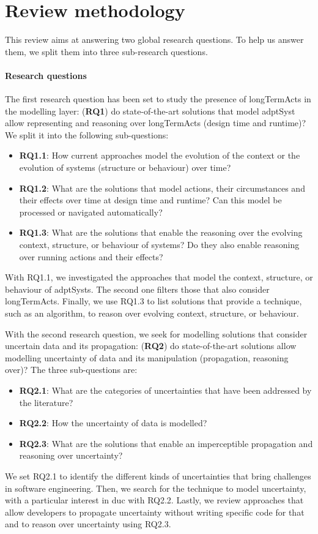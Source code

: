 \section{Review methodology}
\label{sec:sota:methodo}

This review aims at answering two global research questions.
To help us answer them, we split them into three sub-research questions.

\paragraph{Research questions}
The first research question has been set to study the presence of \glspl{longTermAct} in the modelling layer: (\textbf{RQ1}) do state-of-the-art solutions that model \gls{adptSyst} allow representing and reasoning over \glspl{longTermAct} (design time and runtime)? 
We split it into the following sub-questions:
\begin{itemize}
	\item \textbf{RQ1.1}: How current approaches model the evolution of the \gls{context} or the evolution of systems (\gls{structure} or \gls{behaviour}) over time?
	\item \textbf{RQ1.2}: What are the solutions that model \glspl{action}, their \glspl{circumstance} and their effects over time at design time and runtime? Can this model be processed or navigated automatically?
	\item \textbf{RQ1.3}: What are the solutions that enable the reasoning over the evolving \gls{context}, \gls{structure}, or \gls{behaviour} of systems? Do they also enable reasoning over running \glspl{action} and their effects?
\end{itemize}
With RQ1.1, we investigated the approaches that model the \gls{context}, \gls{structure}, or \gls{behaviour} of \glspl{adptSyst}.
The second one filters those that also consider \glspl{longTermAct}.
Finally, we use RQ1.3 to list solutions that provide a technique, such as an algorithm, to reason over evolving \gls{context}, \gls{structure}, or \gls{behaviour}.

With the second research question, we seek for modelling solutions that consider uncertain data and its propagation: (\textbf{RQ2}) do state-of-the-art solutions allow modelling uncertainty of data and its manipulation (propagation, reasoning over)?
The three sub-questions are:
\begin{itemize}
	\item \textbf{RQ2.1}: What are the categories of uncertainties that have been addressed by the literature?
	\item \textbf{RQ2.2}: How the uncertainty of data is modelled?
	\item \textbf{RQ2.3}: What are the solutions that enable an imperceptible propagation and reasoning over uncertainty?
\end{itemize}
We set RQ2.1 to identify the different kinds of uncertainties that bring challenges in software engineering.
Then, we search for the technique to model uncertainty, with a particular interest in \gls{duc} with RQ2.2.
Lastly, we review approaches that allow developers to propagate uncertainty without writing specific code for that and to reason over uncertainty using RQ2.3.

